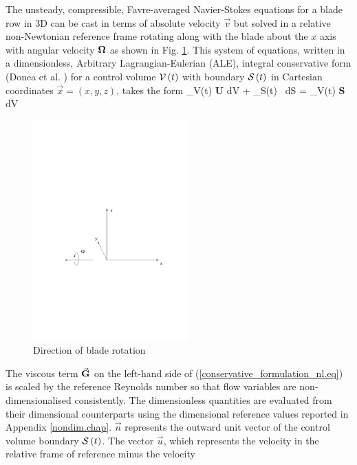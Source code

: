 %
%
 The unsteady, compressible, Favre-averaged Navier-Stokes
 equations for a blade row in 3D can be cast in terms of
 absolute velocity $\vec{v}$ but solved in a relative non-Newtonian reference frame
 rotating along with the blade about the $x$ axis with angular velocity
 ${\bf \Omega}$ as shown in Fig. \ref{axis.fig}.
 This system of equations, written in a dimensionless, Arbitrary
 Lagrangian-Eulerian (ALE), integral conservative
 form (Donea et al. ) for a control
 volume ${\cal V}\left(t\right)$ with boundary
 ${\cal S}\left(t\right)$
 in Cartesian coordinates $\vec{x} = \left(x, y, z\right)$,
 takes the form
%
\beq
  \fpdt{} \int_{{\cal V}\left(t\right)} {\bf U} d{\cal V} +
  \oint_{{\cal S}\left(t\right)} 
  \cdot{}\, d{\cal S} =
  \int_{{\cal V}\left(t\right)} {\bf S}\,d{\cal V}
  \label{conservative_formulation_nl.eq}
\eeq
%
%
\begin{figure}[ht]
  \centerline{\includegraphics[width=60mm,clip=t]{CHAP_NONLIN/FIGURE/axis.pdf}}
  \caption{Direction of blade rotation}
  \label{axis.fig}
\end{figure}
%
 The viscous term $\vec{\bf G}$
 on the left-hand side of (\ref{conservative_formulation_nl.eq})
 is scaled by the reference Reynolds number so that flow variables are
 non-dimensionalised consistently. The dimensionless quantities are evaluated
 from their dimensional counterparts using the dimensional reference values
 reported in Appendix \ref{nondim.chap}.
 $\vec{n}$ represents the outward unit vector of the control volume boundary
 ${\cal S}\left(t\right)$. The vector $\vec{u}$, which represents the
 velocity in the relative frame of reference minus the velocity
